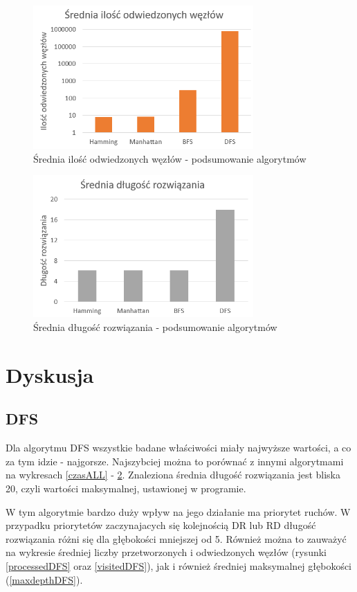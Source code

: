 \documentclass{classrep}
\begin{document}
\begin{figure}[h!]
    \centering
    \includegraphics[width=0.75\textwidth]{visitedALL.png}
    \caption{Średnia ilość odwiedzonych węzłów - podsumowanie algorytmów}
	\label{visitedALL}
\end{figure}
\begin{figure}[h!]
    \centering
    \includegraphics[width=0.75\textwidth]{sredniaALL.png}
    \caption{Średnia długość rozwiązania - podsumowanie algorytmów}
	\label{sredniaALL}
\end{figure}

\newpage
\section{Dyskusja} %
\subsection{DFS}
Dla algorytmu DFS wszystkie badane właściwości miały najwyższe wartości, a co za tym idzie - najgorsze. Najszybciej można to porównać z innymi algorytmami na wykresach \ref{czasALL} - \ref{sredniaALL}. Znaleziona średnia długość rozwiązania jest bliska 20, czyli wartości maksymalnej, ustawionej w programie. 

W tym algorytmie bardzo duży wpływ na jego działanie ma priorytet ruchów. W przypadku priorytetów zaczynajacych się kolejnością DR lub RD długość rozwiązania różni się dla głębokości mniejszej od 5. Również można to zauważyć na wykresie średniej liczby przetworzonych i odwiedzonych węzłów (rysunki \ref{processedDFS} oraz \ref{visitedDFS}), jak i również średniej maksymalnej głębokości (\ref{maxdepthDFS}). 
\end{document}

